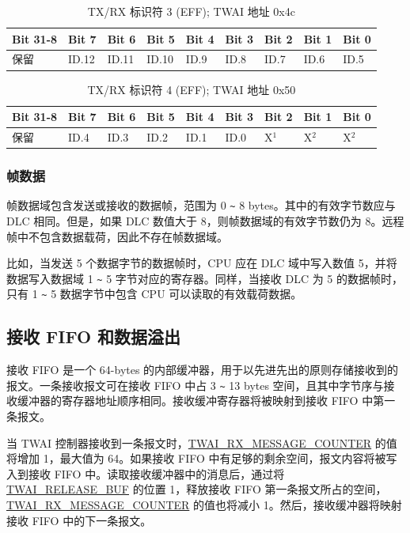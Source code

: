 \documentclass[main\_\_CN.tex]{subfiles}
\begin{document}
\begin{longtable}[c]{|p{1.4cm}|p{1.4cm}|p{1.4cm}|p{1.4cm}|p{1.4cm}|p{1.4cm}|p{1.4cm}|p{1.4cm}|p{1.4cm}|}
    \caption{TX/RX 标识符 3 (EFF); TWAI 地址 0x4c}
    \label{table:tx_id3_eff}\\
    \hline
       \rowcolor{lightgray}
    Bit 31-8 & Bit 7 & Bit 6 & Bit 5 & Bit 4 & Bit 3 & Bit 2 & Bit 1 & Bit 0\\
    \hline
    保留 & ID.12 & ID.11 & ID.10 & ID.9 & ID.8 & ID.7 & ID.6 & ID.5\\
    \hline
\end{longtable}

\begin{longtable}[c]{|p{1.4cm}|p{1.4cm}|p{1.4cm}|p{1.4cm}|p{1.4cm}|p{1.4cm}|p{1.4cm}|p{1.4cm}|p{1.4cm}|}
    \caption{TX/RX 标识符 4 (EFF); TWAI 地址 0x50}
    \label{table:tx_id4_eff}\\
    \hline
       \rowcolor{lightgray}
    Bit 31-8 & Bit 7 & Bit 6 & Bit 5 & Bit 4 & Bit 3 & Bit 2 & Bit 1 & Bit 0\\
    \hline
    保留 & ID.4 & ID.3 & ID.2 & ID.1 & ID.0 & X$^1$ & X$^2$ & X$^2$\\
    \hline
\end{longtable}

\subsubsection{帧数据}
帧数据域包含发送或接收的数据帧，范围为 0 \verb+~+ 8 bytes。其中的有效字节数应与 DLC 相同。但是，如果 DLC 数值大于 8，则帧数据域的有效字节数仍为 8。远程帧中不包含数据载荷，因此不存在帧数据域。

比如，当发送 5 个数据字节的数据帧时，CPU 应在 DLC 域中写入数值 5，并将数据写入数据域 1 \verb+~+ 5 字节对应的寄存器。同样，当接收 DLC 为 5 的数据帧时，只有 1 \verb+~+ 5 数据字节中包含 CPU 可以读取的有效载荷数据。

\subsection{接收 FIFO 和数据溢出}

接收 FIFO 是一个 64-bytes 的内部缓冲器，用于以先进先出的原则存储接收到的报文。一条接收报文可在接收 FIFO 中占 3 \verb+~+ 13 bytes 空间，且其中字节序与接收缓冲器的寄存器地址顺序相同。接收缓冲寄存器将被映射到接收 FIFO 中第一条报文。

当 TWAI 控制器接收到一条报文时，\hyperref[fielddesc:TWAIRXMESSAGECOUNTER]{TWAI\_RX\_MESSAGE\_COUNTER} 的值将增加 1，最大值为 64。如果接收 FIFO 中有足够的剩余空间，报文内容将被写入到接收 FIFO 中。读取接收缓冲器中的消息后，通过将 \hyperref[fielddesc:TWAIRELEASEBUF]{TWAI\_RELEASE\_BUF} 的位置 1，释放接收 FIFO 第一条报文所占的空间，\hyperref[fielddesc:TWAIRXMESSAGECOUNTER]{TWAI\_RX\_MESSAGE\_COUNTER} 的值也将减小 1。然后，接收缓冲器将映射接收 FIFO 中的下一条报文。
\end{document}

